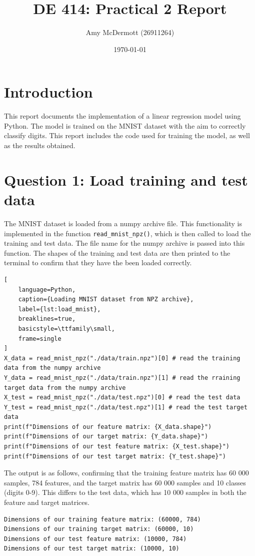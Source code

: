 \documentclass[11pt]{article}
\title{DE 414: Practical 2 Report}
\author{Amy McDermott (26911264)}
\date{\today}
\begin{document}
\maketitle

\section*{Introduction}
This report documents the implementation of a linear regression model using Python. The model is trained on the MNIST dataset with the aim to 
correctly classify digits. This report includes the code used for training the model, as well as the results obtained.

\section{Question 1: Load training and test data}
The MNIST dataset is loaded from a numpy archive file. This functionality is implemented in the function \texttt{read\_mnist\_npz()}, which is then called to load the training and test data.
The file name for the numpy archive is passed into this function. The shapes of the training and test data are then printed to the terminal to confirm that they have the been loaded correctly.

\begin{lstlisting}[
    language=Python, 
    caption={Loading MNIST dataset from NPZ archive},
    label={lst:load_mnist},
    breaklines=true,
    basicstyle=\ttfamily\small,
    frame=single
]
X_data = read_mnist_npz("./data/train.npz")[0] # read the training data from the numpy archive
Y_data = read_mnist_npz("./data/train.npz")[1] # read the rraining target data from the numpy archive
X_test = read_mnist_npz("./data/test.npz")[0] # read the test data
Y_test = read_mnist_npz("./data/test.npz")[1] # read the test target data
print(f"Dimensions of our feature matrix: {X_data.shape}")
print(f"Dimensions of our target matrix: {Y_data.shape}")
print(f"Dimensions of our test feature matrix: {X_test.shape}")
print(f"Dimensions of our test target matrix: {Y_test.shape}")
\end{lstlisting}

The output is as follows, confirming that the training feature matrix has 60 000 samples, 784 features, and the target matrix has 60 000 samples and 10 classes (digits 0-9). This differs to the test data, which has 10 000 samples in both the feature and target matrices.
\begin{lstlisting}[style=terminal, caption={Code execution output}]
Dimensions of our training feature matrix: (60000, 784)
Dimensions of our training target matrix: (60000, 10)
Dimensions of our test feature matrix: (10000, 784)
Dimensions of our test target matrix: (10000, 10)
\end{lstlisting}
\end{document}
